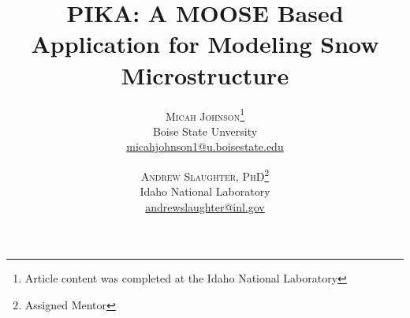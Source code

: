 \documentclass[twoside]{article}
\title{\vspace{-15mm}\fontsize{24pt}{10pt}\selectfont\textbf{PIKA: A MOOSE Based Application for Modeling Snow Microstructure}} %
\author{
\large
\textsc{Micah Johnson}\thanks{Article content was completed at the Idaho National Laboratory}\\[2mm] %
\normalsize  Boise State Unversity \\ %
\normalsize \href{mailto:micahjohnson1@u.boisestate.edu}{micahjohnson1@u.boisestate.edu} %
\vspace{-5mm}
\and
\large
\textsc{Andrew Slaughter, PhD}\thanks{Assigned Mentor}\\[2mm] %
\normalsize  Idaho National Laboratory \\ %
\normalsize \href{mailto:andrewslaughter@inl.gov}{andrewslaughter@inl.gov} %
\vspace{-5mm}
}
\date{}
\begin{document}
\maketitle %

\thispagestyle{fancy} %


\begin{abstract}

\noindent

\end{abstract}

\end{document}
